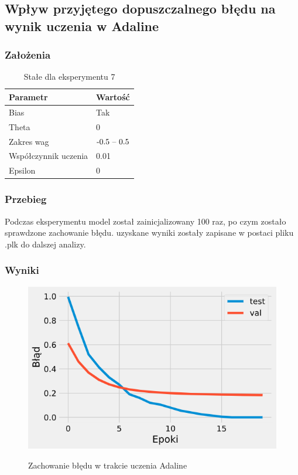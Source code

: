 \documentclass{article}
\begin{document}
\newpage
\subsection{Wpływ przyjętego dopuszczalnego błędu na wynik uczenia w Adaline}
\subsubsection*{Założenia}
\begin{table}[h]
	\caption{Stałe dla eksperymentu 7}
	\label{tabela-const-7}
	\centering
	\begin{tabular}{ll}
		\toprule
		Parametr               & Wartość         \\
		\midrule
		Bias                   & Tak               \\
		Theta                  & 0                 \\
		Zakres wag             & \($-0.5 -- 0.5$\) \\
		Współczynnik uczenia & 0.01              \\
		Epsilon                & 0                 \\
		\bottomrule
	\end{tabular}
\end{table}
\subsubsection*{Przebieg}

Podczas eksperymentu model został zainicjalizowany 100 raz, po czym zostało sprawdzone zachowanie błędu. uzyskane wyniki zostały zapisane w postaci pliku .plk do dalszej analizy.

\subsubsection*{Wyniki}

\begin{figure}[h]
	\centering
	\caption{Zachowanie błędu w trakcie uczenia Adaline}
	\includegraphics[width=.5\textwidth]{ada_epsilon.png}
	\label{fig:res7}
\end{figure}
\end{document}
